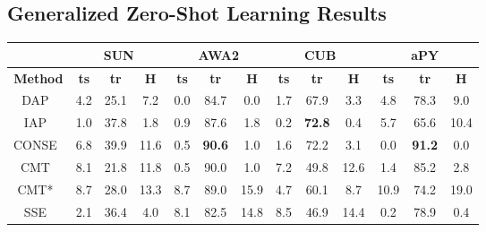 \documentclass[10pt,twocolumn,letterpaper]{article}
\begin{document}
\subsection{Generalized Zero-Shot Learning Results}
\begin{table*}[t!]
	\centering
	\small
	\begin{tabular}{|c|c|c|c|c|c|c|c|c|c|c|c|c|}
		\hline
		& \multicolumn{3}{c|}{\textbf{SUN}}             & \multicolumn{3}{c|}{\textbf{AWA2}}            & \multicolumn{3}{c|}{\textbf{CUB}}             & \multicolumn{3}{c|}{\textbf{aPY}}    \\ \hline
		\textbf{Method}   & \textbf{ts}            & \textbf{tr}            & \textbf{H}             & \textbf{ts}            & \textbf{tr}            & \textbf{H}             & \textbf{ts}            & \textbf{tr}            & \textbf{H}             & \textbf{ts}            & \textbf{tr}   & \textbf{H}             \\ \hline
		DAP~\cite{lampert2014attribute}                & 4.2           & 25.1          & 7.2           & 0.0           & 84.7          & 0.0           & 1.7           & 67.9          & 3.3           & 4.8           & 78.3 & 9.0           \\
		IAP~\cite{lampert2014attribute}                & 1.0           & 37.8          & 1.8           & 0.9           & 87.6          & 1.8           & 0.2           & \textbf{72.8} & 0.4           & 5.7           & 65.6 & 10.4          \\
		CONSE~\cite{norouzi2013zero}             & 6.8           & 39.9 & 11.6          & 0.5           & \textbf{90.6} & 1.0           & 1.6           & 72.2          & 3.1           & 0.0           & \textbf{91.2} & 0.0           \\
		CMT~\cite{socher2013zero}               & 8.1           & 21.8          & 11.8          & 0.5           & 90.0          & 1.0           & 7.2           & 49.8          & 12.6          & 1.4           & 85.2 & 2.8           \\
		CMT*~\cite{socher2013zero}              & 8.7           & 28.0          & 13.3          & 8.7           & 89.0          & 15.9          & 4.7           & 60.1          & 8.7           & 10.9          & 74.2 & 19.0          \\
		SSE~\cite{zhang2015zero}               & 2.1           & 36.4          & 4.0           & 8.1           & 82.5          & 14.8          & 8.5           & 46.9          & 14.4          & 0.2           & 78.9 & 0.4           \\

\end{tabular}
\end{table*}
\end{document}
